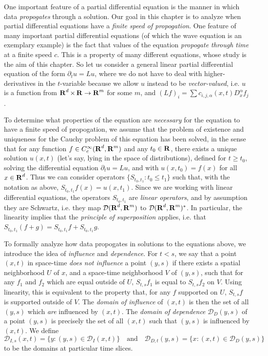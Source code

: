 One important feature of a partial differential equation is the manner in which data \emph{propogates} through a solution. Our goal in this chapter is to analyze when partial differential equations have a \emph{finite speed of propogation}. One feature of many important partial differential equations (of which the wave equation is an exemplary example) is the fact that values of the equation \emph{propogate through time} at a finite speed $c$. This is a property of many different equations, whose study is the aim of this chapter. So let us consider a general linear partial differential equation of the form $\partial_t u = Lu$, where we do not have to deal with higher-derivatives in the $t$-variable because we allow $u$ instead to be \emph{vector-valued}, i.e. $u$ is a function from $\operatorname{\mathbf{R}}^d \times \operatorname{\mathbf{R}} \to \operatorname{\mathbf{R}}^m$ for some $m$, and $(Lf)_i = \sum c_{i,j,\alpha}(x,t) D^\alpha_x f_j$.

To determine what properties of the equation are \emph{necessary} for the equation to have a finite speed of propogation, we assume that the problem of existence and uniqueness for the Cauchy problem of this equation has been solved, in the sense that for any function $f \in C_c^\infty(\operatorname{\mathbf{R}}^d, \operatorname{\mathbf{R}}^m)$ and any $t_0 \in \operatorname{\mathbf{R}}$, there exists a unique solution $u(x,t)$ (let's say, lying in the space of distributions), defined for $t \geq t_0$, solving the differential equation $\partial_t u = Lu$, and with $u(x,t_0) = f(x)$ for all $x \in \operatorname{\mathbf{R}}^d$. Thus we can consider operators $\{ S_{t_0,t_1} : t_0 \leq t_1 \}$ such that, with the notation as above, $S_{t_0,t_1} f(x) = u(x,t_1)$. Since we are working with linear differential equations, the operators $S_{t_0,t_1}$ are \emph{linear operators}, and by assumption they are Schwartz, i.e. they map $\mathcal{D}(\operatorname{\mathbf{R}}^d,\operatorname{\mathbf{R}}^m)$ to $\mathcal{D}(\operatorname{\mathbf{R}}^d,\operatorname{\mathbf{R}}^m)^*$. In particular, the linearity implies that  the \emph{principle of superposition} applies, i.e. that $S_{t_0,t_1}(f + g) = S_{t_0,t_1} f + S_{t_0,t_1} g$.

To formally analyze how data propogates in solutions to the equations above, we introduce the idea of \emph{influence} and \emph{dependence}. For $t < s$, we say that a point $(x,t)$ in space-time \emph{does not influence} a point $(y,s)$ if there exists a spatial neighborhood $U$ of $x$, and a space-time neighborhood $V$ of $(y,s)$, such that for any $f_1$ and $f_2$ which are equal outside of $U$, $S_{t,s} f_1$ is equal to $S_{t,s} f_2$ on $V$. Using linearity, this is equivalent to the property that, for any $f$ supported on $U$, $S_{t,s} f$ is supported outside of $V$. The \emph{domain of influence} of $(x,t)$ is then the set of all $(y,s)$ which \emph{are} influenced by $(x,t)$. The \emph{domain of dependence} $\mathcal{D}_D(y,s)$ of a point $(y,s)$ is precisely the set of all $(x,t)$ such that $(y,s)$ is influenced by $(x,t)$. We define
%
\[ \mathcal{D}_{I,s}(x,t) = \{ y : (y,s) \in \mathcal{D}_I(x,t) \} \quad\text{and}\quad \mathcal{D}_{D,t}(y,s) = \{ x : (x,t) \in \mathcal{D}_D(y,s) \} \]
%
to be the domains at particular time slices.

